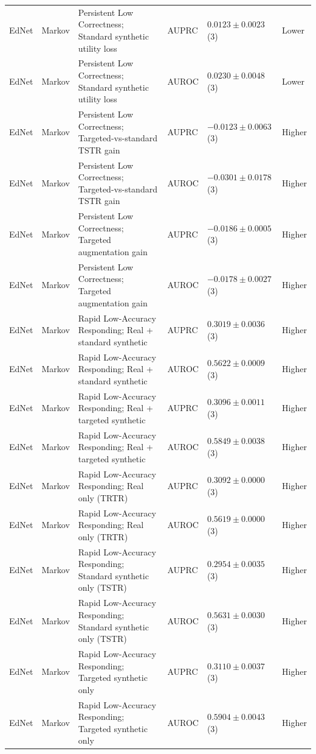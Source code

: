 \begin{longtable}{@{}p{2.25cm}p{2.05cm}p{4.7cm}p{5.0cm}p{2.6cm}p{1.25cm}@{}}
EdNet & Markov & Persistent Low Correctness; Standard synthetic utility loss & AUPRC & $0.0123 \mathbin{\pm} 0.0023$ (3) & Lower \\
EdNet & Markov & Persistent Low Correctness; Standard synthetic utility loss & AUROC & $0.0230 \mathbin{\pm} 0.0048$ (3) & Lower \\
EdNet & Markov & Persistent Low Correctness; Targeted-vs-standard TSTR gain & AUPRC & $-0.0123 \mathbin{\pm} 0.0063$ (3) & Higher \\
EdNet & Markov & Persistent Low Correctness; Targeted-vs-standard TSTR gain & AUROC & $-0.0301 \mathbin{\pm} 0.0178$ (3) & Higher \\
EdNet & Markov & Persistent Low Correctness; Targeted augmentation gain & AUPRC & $-0.0186 \mathbin{\pm} 0.0005$ (3) & Higher \\
EdNet & Markov & Persistent Low Correctness; Targeted augmentation gain & AUROC & $-0.0178 \mathbin{\pm} 0.0027$ (3) & Higher \\
EdNet & Markov & Rapid Low-Accuracy Responding; Real + standard synthetic & AUPRC & $0.3019 \mathbin{\pm} 0.0036$ (3) & Higher \\
EdNet & Markov & Rapid Low-Accuracy Responding; Real + standard synthetic & AUROC & $0.5622 \mathbin{\pm} 0.0009$ (3) & Higher \\
EdNet & Markov & Rapid Low-Accuracy Responding; Real + targeted synthetic & AUPRC & $0.3096 \mathbin{\pm} 0.0011$ (3) & Higher \\
EdNet & Markov & Rapid Low-Accuracy Responding; Real + targeted synthetic & AUROC & $0.5849 \mathbin{\pm} 0.0038$ (3) & Higher \\
EdNet & Markov & Rapid Low-Accuracy Responding; Real only (TRTR) & AUPRC & $0.3092 \mathbin{\pm} 0.0000$ (3) & Higher \\
EdNet & Markov & Rapid Low-Accuracy Responding; Real only (TRTR) & AUROC & $0.5619 \mathbin{\pm} 0.0000$ (3) & Higher \\
EdNet & Markov & Rapid Low-Accuracy Responding; Standard synthetic only (TSTR) & AUPRC & $0.2954 \mathbin{\pm} 0.0035$ (3) & Higher \\
EdNet & Markov & Rapid Low-Accuracy Responding; Standard synthetic only (TSTR) & AUROC & $0.5631 \mathbin{\pm} 0.0030$ (3) & Higher \\
EdNet & Markov & Rapid Low-Accuracy Responding; Targeted synthetic only & AUPRC & $0.3110 \mathbin{\pm} 0.0037$ (3) & Higher \\
EdNet & Markov & Rapid Low-Accuracy Responding; Targeted synthetic only & AUROC & $0.5904 \mathbin{\pm} 0.0043$ (3) & Higher \\

\end{longtable}
